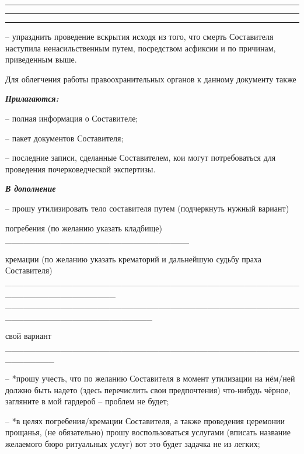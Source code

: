 \documentclass[
  a5paperpaper,
  DIV=11,
  numbers=noendperiod]{scrreprt}
\begin{document}
\begin{center}\rule{0.5\linewidth}{0.5pt}\end{center}

\begin{center}\rule{0.5\linewidth}{0.5pt}\end{center}

\begin{center}\rule{0.5\linewidth}{0.5pt}\end{center}

-- упразднить проведение вскрытия исходя из того, что смерть Составителя
наступила ненасильственным путем, посредством асфиксии и по причинам,
приведенным выше.

Для облегчения работы правоохранительных органов к данному документу
также

\textbf{\emph{Прилагаются:}}

-- полная информация о Составителе;

-- пакет документов Составителя;

-- последние записи, сделанные Составителем, кои могут потребоваться для
проведения почерковедческой экспертизы.

\textbf{\emph{В дополнение}}

-- прошу утилизировать тело составителя путем (подчеркнуть нужный
вариант)

погребения (по желанию указать кладбище)
\_\_\_\_\_\_\_\_\_\_\_\_\_\_\_\_\_\_\_\_\_\_\_\_\_\_\_\_\_\_

кремации (по желанию указать крематорий и дальнейшую судьбу праха
Составителя)
\_\_\_\_\_\_\_\_\_\_\_\_\_\_\_\_\_\_\_\_\_\_\_\_\_\_\_\_\_\_\_\_\_\_\_\_\_\_\_\_\_\_\_\_\_\_\_\_\_\_\_\_\_\_\_\_\_\_\_\_\_\_\_\_\_\_
\_\_\_\_\_\_\_\_\_\_\_\_\_\_\_\_\_\_\_\_\_\_\_\_\_\_\_\_\_\_\_\_\_\_\_\_\_\_\_\_\_\_\_\_\_\_\_\_\_\_\_\_\_\_\_\_\_\_\_\_\_\_\_\_\_\_\_\_\_\_\_\_

свой вариант
\_\_\_\_\_\_\_\_\_\_\_\_\_\_\_\_\_\_\_\_\_\_\_\_\_\_\_\_\_\_\_\_\_\_\_\_\_\_\_\_\_\_\_\_\_\_\_\_\_\_\_\_\_\_\_\_

-- *прошу учесть, что по желанию Составителя в момент утилизации на
нём/ней должно быть надето (здесь перечислить свои предпочтения)
что-нибудь чёрное, загляните в мой гардероб -- проблем не будет;

-- *в целях погребения/кремации Составителя, а также проведения
церемонии прощанья, (не обязательно) прошу воспользоваться услугами
(вписать название желаемого бюро ритуальных услуг) вот это будет задачка
не из легких;
\end{document}
